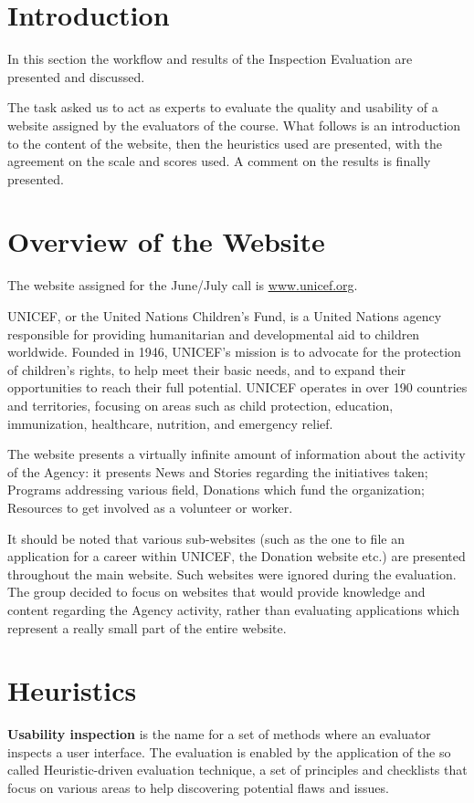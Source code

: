 \section{Introduction}
In this section the workflow and results of the Inspection Evaluation are presented and discussed.

The task asked us to act as experts to evaluate the quality and usability of a website assigned by the evaluators of the course. What follows is an introduction to the content of the website, then the heuristics used are presented, with the agreement on the scale and scores used. A comment on the results is finally presented.



\section{Overview of the Website}
The website assigned for the June/July call is \underline{\url{www.unicef.org}}.

UNICEF, or the United Nations Children’s Fund, is a United Nations agency responsible for providing humanitarian and developmental aid to children worldwide. Founded in 1946, UNICEF’s mission is to advocate for the protection of children’s rights, to help meet their basic needs, and to expand their opportunities to reach their full potential. UNICEF operates in over 190 countries and territories, focusing on areas such as child protection, education, immunization, healthcare, nutrition, and emergency relief.

The website presents a virtually infinite amount of information about the activity of the Agency: it presents News and Stories regarding the initiatives taken; Programs addressing various field, Donations which fund the organization; Resources to get involved as a volunteer or worker.

It should be noted that various sub-websites (such as the one to file an application for a career within UNICEF, the Donation website etc.) are presented throughout the main website. Such websites were ignored during the evaluation. The group decided to focus on websites that would provide knowledge and content regarding the Agency activity, rather than evaluating applications which represent a really small part of the entire website.

\section{Heuristics}
\textbf{Usability inspection} is the name for a set of methods where an evaluator inspects a user interface.
The evaluation is enabled by the application of the so called Heuristic-driven evaluation technique, a set of principles and checklists that focus on various areas to help discovering potential flaws and issues.


